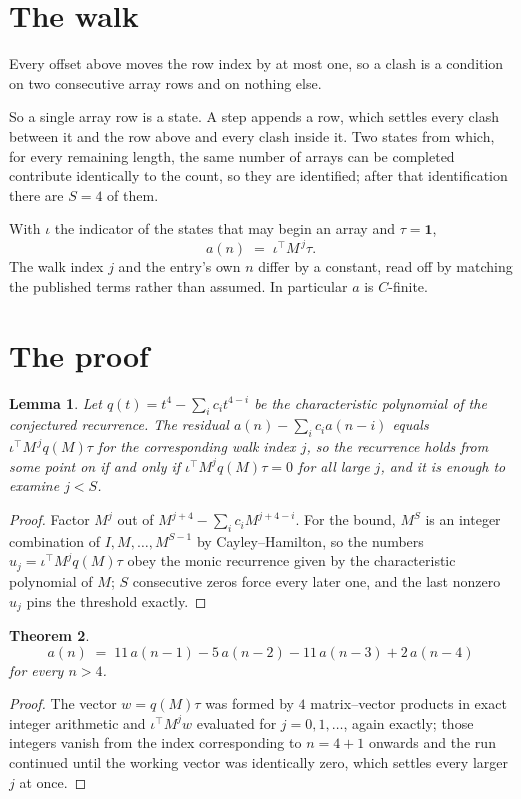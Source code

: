 \documentclass[11pt,a4paper]{article}
\theoremstyle{plain}
\newtheorem{theorem}{Theorem}
\newtheorem{lemma}[theorem]{Lemma}
\theoremstyle{definition}
\begin{document}
\section{The walk}

Every offset above moves the row index by at most one, so a clash is a condition on two
consecutive array rows and on nothing else.

So a single array row is a state. A step appends a row, which settles every clash between it
and the row above and every clash inside it. Two states from which, for every remaining length,
the same number of arrays can be completed contribute identically to the count, so they are
identified; after that identification there are $S=4$ of them.

With $\iota$ the indicator of the states that may begin an array and $\tau=\mathbf{1}$,
\[
a(n)\;=\;\iota^{\!\top}M^{\,j}\tau .
\]
The walk index $j$ and the entry's own $n$ differ by a constant, read off by matching the
published terms rather than assumed. In particular $a$ is $C$-finite.

\section{The proof}

\begin{lemma}\label{lem:crit}
Let $q(t)=t^{4}-\sum_i c_it^{4-i}$ be the characteristic polynomial of the
conjectured recurrence. The residual $a(n)-\sum_ic_ia(n-i)$ equals
$\iota^{\!\top}M^{\,j}q(M)\tau$ for the corresponding walk index $j$, so the recurrence
holds from some point on if and only if $\iota^{\!\top}M^{j}q(M)\tau=0$ for all large $j$,
and it is enough to examine $j<S$.
\end{lemma}

\begin{proof}
Factor $M^{j}$ out of $M^{j+4}-\sum_ic_iM^{j+4-i}$. For the bound, $M^{S}$
is an integer combination of $I,M,\dots,M^{S-1}$ by Cayley--Hamilton, so the numbers
$u_j=\iota^{\!\top}M^{j}q(M)\tau$ obey the monic recurrence given by the characteristic
polynomial of $M$; $S$ consecutive zeros force every later one, and the last nonzero $u_j$
pins the threshold exactly.
\end{proof}

\begin{theorem}
\[
a(n)\;=\;11\,a(n-1) - 5\,a(n-2) - 11\,a(n-3) + 2\,a(n-4)
\]
for every $n>4$.
\end{theorem}

\begin{proof}
The vector $w=q(M)\tau$ was formed by $4$ matrix--vector products in exact integer
arithmetic and $\iota^{\!\top}M^{j}w$ evaluated for $j=0,1,\dots$, again exactly; those
integers vanish from the index corresponding to $n=4+1$ onwards and the run continued
until the working vector was identically zero, which settles every larger $j$ at once.
\end{proof}
\end{document}
